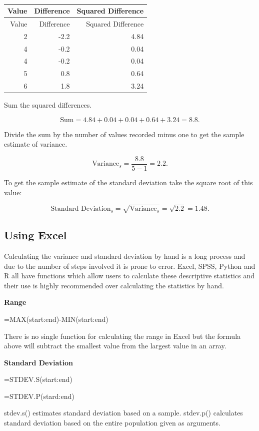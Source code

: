 \documentclass[
]{book}
\begin{document}
\begin{longtable}[]{@{}rrr@{}}
\caption{\label{tab:table9}}\tabularnewline
\toprule
Value & Difference & Squared Difference \\
\midrule
\endfirsthead
\toprule
Value & Difference & Squared Difference \\
\midrule
\endhead
2 & -2.2 & 4.84 \\
4 & -0.2 & 0.04 \\
4 & -0.2 & 0.04 \\
5 & 0.8 & 0.64 \\
6 & 1.8 & 3.24 \\
\bottomrule
\end{longtable}

Sum the squared differences.

\[\textrm{Sum} = 4.84 + 0.04 + 0.04 + 0.64 + 3.24 = 8.8. \]

Divide the sum by the number of values recorded minus one to get the sample estimate of variance.

\[ \textrm{Variance}_{s} = \frac{8.8}{5-1} = 2.2.\]

To get the sample estimate of the standard deviation take the square root of this value:

\[ \textrm{Standard Deviation}_s = \sqrt{ \textrm{Variance}_{s}} = \sqrt{2.2} = 1.48.\]

\hypertarget{using-excel-1}{%
\subsection{Using Excel}\label{using-excel-1}}

Calculating the variance and standard deviation by hand is a long process and due to the number of steps involved it is prone to error. Excel, SPSS, Python and R all have functions which allow users to calculate these descriptive statistics and their use is highly recommended over calculating the statistics by hand.

\textbf{Range}

=MAX(start:end)-MIN(start:end)

There is no single function for calculating the range in Excel but the formula above will subtract the smallest value from the largest value in an array.

\textbf{Standard Deviation}

=STDEV.S(start:end)

=STDEV.P(stard:end)

stdev.s() estimates standard deviation based on a sample. stdev.p() calculates standard deviation based on the entire population given as arguments.
\end{document}
